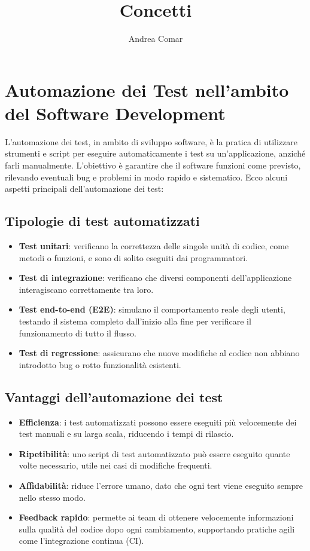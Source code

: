 \documentclass{article}
\title{Concetti}
\author{Andrea Comar}
\begin{document}
\maketitle
\tableofcontents
\newpage

\section{Automazione dei Test nell'ambito del Software Development}

L'automazione dei test, in ambito di sviluppo software, è la pratica di utilizzare strumenti e script per eseguire automaticamente i test su un'applicazione, anziché farli manualmente. L'obiettivo è garantire che il software funzioni come previsto, rilevando eventuali bug e problemi in modo rapido e sistematico. Ecco alcuni aspetti principali dell'automazione dei test:

\subsection{Tipologie di test automatizzati}
\begin{itemize}
    \item \textbf{Test unitari}: verificano la correttezza delle singole unità di codice, come metodi o funzioni, e sono di solito eseguiti dai programmatori.
    \item \textbf{Test di integrazione}: verificano che diversi componenti dell’applicazione interagiscano correttamente tra loro.
    \item \textbf{Test end-to-end (E2E)}: simulano il comportamento reale degli utenti, testando il sistema completo dall’inizio alla fine per verificare il funzionamento di tutto il flusso.
    \item \textbf{Test di regressione}: assicurano che nuove modifiche al codice non abbiano introdotto bug o rotto funzionalità esistenti.
\end{itemize}

\subsection{Vantaggi dell'automazione dei test}
\begin{itemize}
    \item \textbf{Efficienza}: i test automatizzati possono essere eseguiti più velocemente dei test manuali e su larga scala, riducendo i tempi di rilascio.
    \item \textbf{Ripetibilità}: uno script di test automatizzato può essere eseguito quante volte necessario, utile nei casi di modifiche frequenti.
    \item \textbf{Affidabilità}: riduce l'errore umano, dato che ogni test viene eseguito sempre nello stesso modo.
    \item \textbf{Feedback rapido}: permette ai team di ottenere velocemente informazioni sulla qualità del codice dopo ogni cambiamento, supportando pratiche agili come l'integrazione continua (CI).
\end{itemize}
\end{document}
